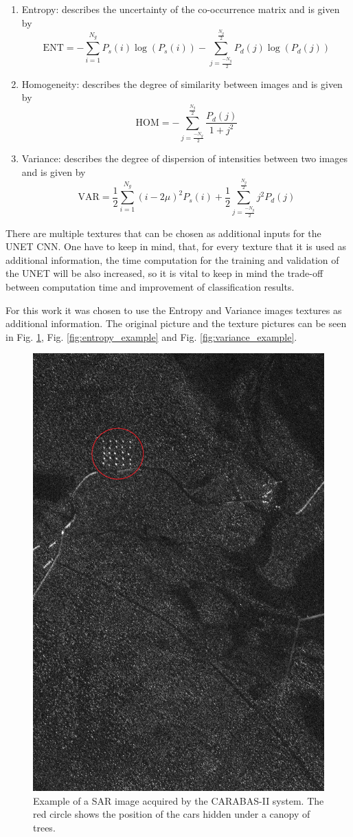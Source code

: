 \begin{enumerate}
    \item Entropy: describes the uncertainty of the co-occurrence matrix and is given by
    \begin{equation}
        \textrm{ENT} = -\sum_{i=1}^{N_g}P_s(i)\log(P_s(i)) - \sum_{j=\frac{-N_g}{2}}^{\frac{N_g}{2}} P_d(j)\log(P_d(j))
    \end{equation}
    
    \item Homogeneity: describes the degree of similarity between images and is given by
    \begin{equation}
        \textrm{HOM} = - \sum_{j=\frac{-N_g}{2}}^{\frac{N_g}{2}} \frac{P_d(j)}{1+j^2}
    \end{equation}
    
    \item Variance: describes the degree of dispersion of intensities between two images and is given by
    \begin{equation}
        \textrm{VAR} = \frac{1}{2} \sum_{i=1}^{N_g}(i-2\mu)^2 P_s(i) + 
         \frac{1}{2}\sum_{j=\frac{-N_g}{2}}^{\frac{N_g}{2}} j^2 P_d(j)
    \end{equation}
\end{enumerate}

There are multiple textures that can be chosen as additional inputs for the UNET CNN. One have to keep in mind, that, for every texture that it is used as additional information, 
the time computation for the training and validation of the UNET will be also increased, so it is vital to keep in mind the trade-off between computation time and improvement of classification results.

For this work it was chosen to use the Entropy and Variance images textures as additional information. The original picture and the texture pictures can be seen in Fig. \ref{fig:exemplo_carabas}, Fig. \ref{fig:entropy_example} and Fig. \ref{fig:variance_example}.

\begin{figure}[h]
    \centering
    \includegraphics[width=0.45\linewidth]{Chapter7/exemplo_carabas.jpg}
    \caption{ Example of a SAR image acquired by the CARABAS-II system.
    The red circle shows the position of the cars hidden under a canopy of trees.}
    \label{fig:exemplo_carabas}
\end{figure}

